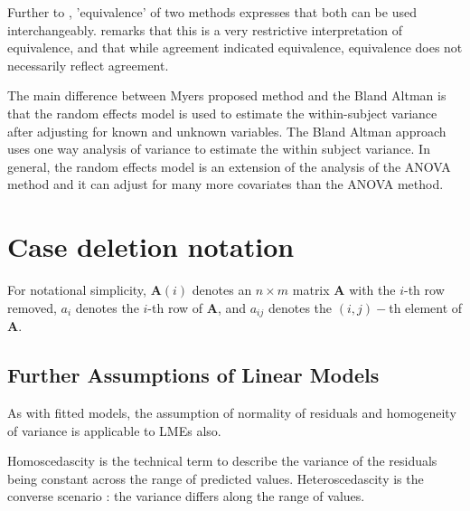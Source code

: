 \documentclass[12pt, a4paper]{report}
\theoremstyle{plain}
\theoremstyle{definition}
\theoremstyle{remark}
\begin{document}
\bigskip Further to \citet{BA86}, 'equivalence' of two methods expresses
that both can be used interchangeably.
\citet[p.49]{DunnSEME} remarks that this is a very restrictive
interpretation of equivalence, and that while agreement indicated
equivalence, equivalence does not necessarily reflect agreement.

The main difference between Myers proposed method and the Bland Altman is that the random effects model is used to estimate the
within-subject variance after adjusting for known and unknown variables. The Bland Altman approach uses one way analysis of
variance to estimate the within subject variance. In general, the random effects model is an extension of the analysis of the ANOVA method and it can adjust for many more covariates than the ANOVA method.





\section{Case deletion notation} %

For notational simplicity, $\boldsymbol{A}(i)$ denotes an $n \times m$ matrix $\boldsymbol{A}$ with the $i$-th row
removed, $a_i$ denotes the $i$-th row of $\boldsymbol{A}$, and $a_{ij}$ denotes the $(i, j)-$th element of $\boldsymbol{A}$.
%



\subsection{Further Assumptions of Linear Models}

As with fitted models, the assumption of normality of residuals and homogeneity of variance is applicable to LMEs also. 



Homoscedascity is the technical term to describe the variance of the
residuals being constant across the range of predicted values.
Heteroscedascity is the converse scenario : the variance differs along
the range of values.

\end{document}
